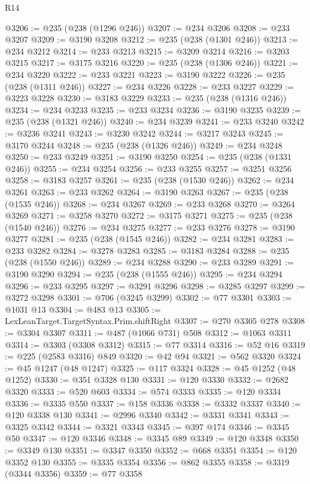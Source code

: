 \begin{lexlean}{R14}
\begin{coremodule}
{{{{{{{{{{{{{{{{{{{{{{{{{{{{{{{{{{{{{{{{{{{{{{{{{{{{{{{{{{{{{{{{{{{{{{{{{{{{{{{{{{{{{{{{{{{{{{{{{{{{{{{{{{@3206 := @235 (@238 (@1296 @246))
@3207 := @234 @3206
@3208 := @233 @3207
@3209 := @3190 @3208
@3212 := @235 (@238 (@1301 @246))
@3213 := @234 @3212
@3214 := @233 @3213
@3215 := @3209 @3214
@3216 := @3203 @3215
@3217 := @3175 @3216
@3220 := @235 (@238 (@1306 @246))
@3221 := @234 @3220
@3222 := @233 @3221
@3223 := @3190 @3222
@3226 := @235 (@238 (@1311 @246))
@3227 := @234 @3226
@3228 := @233 @3227
@3229 := @3223 @3228
@3230 := @3183 @3229
@3233 := @235 (@238 (@1316 @246))
@3234 := @234 @3233
@3235 := @233 @3234
@3236 := @3190 @3235
@3239 := @235 (@238 (@1321 @246))
@3240 := @234 @3239
@3241 := @233 @3240
@3242 := @3236 @3241
@3243 := @3230 @3242
@3244 := @3217 @3243
@3245 := @3170 @3244
@3248 := @235 (@238 (@1326 @246))
@3249 := @234 @3248
@3250 := @233 @3249
@3251 := @3190 @3250
@3254 := @235 (@238 (@1331 @246))
@3255 := @234 @3254
@3256 := @233 @3255
@3257 := @3251 @3256
@3258 := @3183 @3257
@3261 := @235 (@238 (@1530 @246))
@3262 := @234 @3261
@3263 := @233 @3262
@3264 := @3190 @3263
@3267 := @235 (@238 (@1535 @246))
@3268 := @234 @3267
@3269 := @233 @3268
@3270 := @3264 @3269
@3271 := @3258 @3270
@3272 := @3175 @3271
@3275 := @235 (@238 (@1540 @246))
@3276 := @234 @3275
@3277 := @233 @3276
@3278 := @3190 @3277
@3281 := @235 (@238 (@1545 @246))
@3282 := @234 @3281
@3283 := @233 @3282
@3284 := @3278 @3283
@3285 := @3183 @3284
@3288 := @235 (@238 (@1550 @246))
@3289 := @234 @3288
@3290 := @233 @3289
@3291 := @3190 @3290
@3294 := @235 (@238 (@1555 @246))
@3295 := @234 @3294
@3296 := @233 @3295
@3297 := @3291 @3296
@3298 := @3285 @3297
@3299 := @3272 @3298
@3301 := @706 (@3245 @3299)
@3302 := @77 @3301
@3303 := @1031 @13
@3304 := @483 @13
@3305 := LexLeanTarget.TargetSyntax.Prim.shiftRight
@3307 := @270 @3305 @278
@3308 := @3304 @3307
@3311 := @487 (@1066 @731) @508
@3312 := @1063 @3311
@3314 := @3303 (@3308 @3312)
@3315 := @77 @3314
@3316 := @52 @16
@3319 := @225 (@2583 @3316) @849
@3320 := @42 @94
@3321 := @562 @3320
@3324 := @45 @1247 (@48 @1247)
@3325 := @117 @3324
@3328 := @45 @1252 (@48 @1252)
@3330 := @351 @3328 @130
@3331 := @120 @3330
@3332 := @2682 @3320
@3333 := @520 @603
@3334 := @574 @3333
@3335 := @120 @3334
@3336 := @3335 @550
@3337 := @158 @3336
@3338 := @3332 @3337
@3340 := @120 @3338 @130
@3341 := @2996 @3340
@3342 := @3331 @3341
@3343 := @3325 @3342
@3344 := @3321 @3343
@3345 := @397 @174
@3346 := @3345 @50
@3347 := @120 @3346
@3348 := @3345 @89
@3349 := @120 @3348
@3350 := @3349 @130
@3351 := @3347 @3350
@3352 := @668 @3351
@3354 := @120 @3352 @130
@3355 := @3335 @3354
@3356 := @862 @3355
@3358 := @3319 (@3344 @3356)
@3359 := @77 @3358
}}}}}}}}}}}}}}}}}}}}}}}}}}}}}}}}}}}}}}}}}}}}}}}}}}}}}}}}}}}}}}}}}}}}}}}}}}}}}}}}}}}}}}}}}}}}}}}}}}}}}}}}}}
\end{coremodule}
\end{lexlean}
